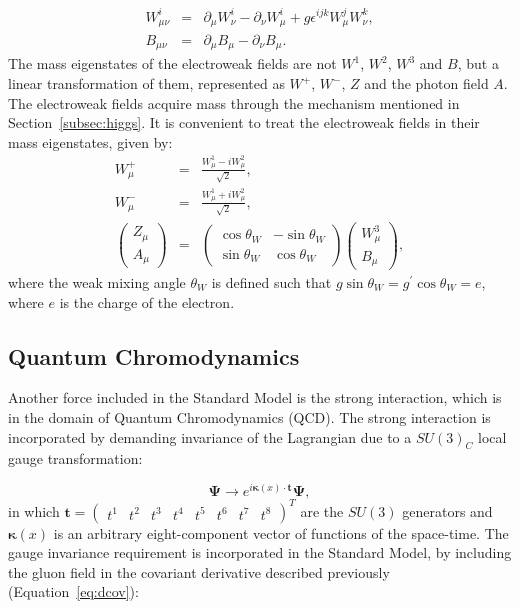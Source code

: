 \begin{eqnarray}
\displaystyle
W^i_{\mu \nu}&=&\partial_\mu W^i_\nu -  \partial_\nu W^i_\mu + g \epsilon^{ijk} W^{j}_\mu W^{k}_\nu , \nonumber \\
B_{\mu \nu}&=& \partial_\mu B_\mu - \partial_\nu B_\mu.
\label{eq:WBfields}
\end{eqnarray}
The mass eigenstates of the electroweak fields are not $W^1$, $W^2$, $W^3$ and $B$,
but a linear transformation of them, represented as $W^+$, $W^-$, $Z$ and the photon field $A$. The electroweak fields acquire mass through the mechanism mentioned
in Section~\ref{subsec:higgs}. It is convenient to treat the electroweak fields in their mass eigenstates, given by:
\begin{eqnarray}
\displaystyle
W^+_\mu & = & \frac{W^1_\mu - iW^2_\mu}{\sqrt{2}}, \\
W^-_\mu & = & \frac{W^1_\mu + iW^2_\mu}{\sqrt{2}}, \\
\begin{pmatrix} Z_\mu \\ A_\mu \end{pmatrix} & = & \begin{pmatrix} \cos \theta_W & -\sin \theta_W \\ \sin \theta_W & \cos \theta_W \end{pmatrix} \begin{pmatrix} W^3_\mu \\ B_\mu \end{pmatrix},
\label{eq:electroweak_transf}
\end{eqnarray}
where the weak mixing angle $\theta_W$ is defined such that $g \sin \theta_W = g^{\prime} \cos \theta_W = e$, where $e$ is the charge of the electron.

\subsection{Quantum Chromodynamics}

Another force included in the Standard Model is the strong interaction, which is in the domain of Quantum Chromodynamics (QCD).
The strong interaction is incorporated by demanding invariance of the Lagrangian due to a $SU(3)_C$ local gauge transformation:

\begin{equation}
\displaystyle
\mathbf{\Psi} \rightarrow e^{i \mathbf{\kappa}(x) \cdot \mathbf{t}} \mathbf{\Psi},
\label{eq:gauge_qcd}
\end{equation}
in which $\mathbf{t} = \begin{pmatrix} t^1 & t^2 & t^3 & t^4 & t^5 & t^6 & t^7 & t^8 \end{pmatrix}^T$ are the $SU(3)$ generators
and
$\mathbf{\kappa}(x)$ is an arbitrary eight-component vector of functions of the space-time.
The gauge invariance requirement is incorporated in the
Standard Model, by including the gluon field in the covariant derivative described previously (Equation~\ref{eq:dcov}):

